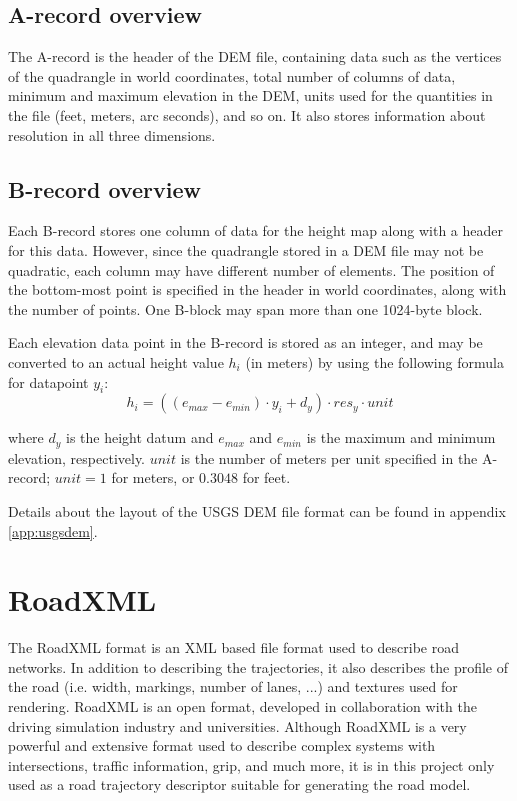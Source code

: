 \subsection{A-record overview}
The A-record is the header of the DEM file, containing data such as the vertices of the quadrangle in world coordinates, total number of columns of data, minimum and maximum elevation in the DEM, units used for the quantities in the file (feet, meters, arc seconds), and so on. It also stores information about resolution in all three dimensions. 

\subsection{B-record overview}
Each B-record stores one column of data for the height map along with a header for this data. However, since the quadrangle stored in a DEM file may not be quadratic, each column may have different number of elements. The position of the bottom-most point is specified in the header in world coordinates, along with the number of points. One B-block may span more than one 1024-byte block.

Each elevation data point in the B-record is stored as an integer, and may be converted to an actual height value $h_i$ (in meters) by using the following formula for datapoint $y_i$:
$$
h_i = ((e_{max}-e_{min})\cdot y_i+ d_y)\cdot res_y \cdot unit
$$

where $d_y$ is the height datum and $e_{max}$ and $e_{min}$ is the maximum and minimum elevation, respectively. $unit$ is the number of meters per unit specified in the A-record; $unit=1$ for meters, or $0.3048$ for feet.

Details about the layout of the USGS DEM file format can be found in appendix \ref{app:usgsdem}.

\section{RoadXML}
The RoadXML format is an XML based file format used to describe road networks. In addition to describing the trajectories, it also describes the profile of the road (i.e. width, markings, number of lanes, ...) and textures used for rendering.\cite{roadxml} RoadXML is an open format, developed in collaboration with the driving simulation industry and universities. Although RoadXML is a very powerful and extensive format used to describe complex systems with intersections, traffic information, grip, and much more, it is in this project only used as a road trajectory descriptor suitable for generating the road model.


